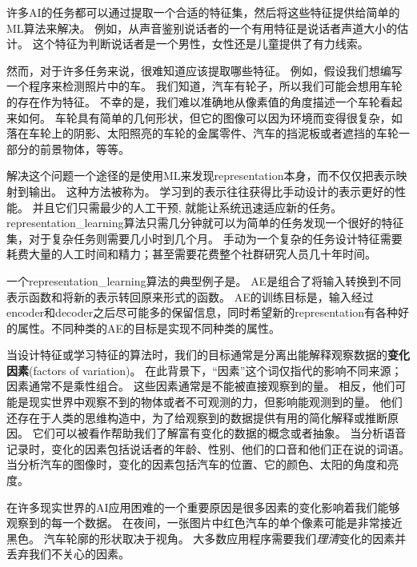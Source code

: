 许多\gls{AI}的任务都可以通过提取一个合适的特征集，然后将这些特征提供给简单的\gls{ML}算法来解决。
例如，从声音鉴别说话者的一个有用特征是说话者声道大小的估计。
这个特征为判断说话者是一个男性，女性还是儿童提供了有力线索。

然而，对于许多任务来说，很难知道应该提取哪些特征。
例如，假设我们想编写一个程序来检测照片中的车。
我们知道，汽车有轮子，所以我们可能会想用车轮的存在作为特征。
不幸的是，我们难以准确地从像素值的角度描述一个车轮看起来如何。
车轮具有简单的几何形状，但它的图像可以因为环境而变得很复杂，如落在车轮上的阴影、太阳照亮的车轮的金属零件、汽车的挡泥板或者遮挡的车轮一部分的前景物体，等等。


解决这个问题一个途径的是使用\gls{ML}来发现\gls{representation}本身，而不仅仅把表示映射到输出。
这种方法被称为。
学习到的表示往往获得比手动设计的表示更好的性能。
并且它们只需最少的人工干预, 就能让系统迅速适应新的任务。
\gls{representation_learning}算法只需几分钟就可以为简单的任务发现一个很好的特征集，对于复杂任务则需要几小时到几个月。
手动为一个复杂的任务设计特征需要耗费大量的人工时间和精力；甚至需要花费整个社群研究人员几十年时间。

一个\gls{representation_learning}算法的典型例子是。
\gls{AE}是组合了将输入转换到不同表示函数和将新的表示转回原来形式的函数。 
\gls{AE}的训练目标是，输入经过\gls{encoder}和\gls{decoder}之后尽可能多的保留信息，同时希望新的\gls{representation}有各种好的属性。不同种类的\gls{AE}的目标是实现不同种类的属性。

当设计特征或学习特征的算法时，我们的目标通常是分离出能解释观察数据的\textbf{变化因素}(factors of variation)。
在此背景下，``因素''这个词仅指代的影响不同来源；因素通常不是乘性组合。
这些因素通常是不能被直接观察到的量。
相反，他们可能是现实世界中观察不到的物体或者不可观测的力，但影响能观测到的量。
他们还存在于人类的思维构造中，为了给观察到的数据提供有用的简化解释或推断原因。
它们可以被看作帮助我们了解富有变化的数据的概念或者抽象。
当分析语音记录时，变化的因素包括说话者的年龄、性别、他们的口音和他们正在说的词语。
当分析汽车的图像时，变化的因素包括汽车的位置、它的颜色、太阳的角度和亮度。


在许多现实世界的\gls{AI}应用困难的一个重要原因是很多因素的变化影响着我们能够观察到的每一个数据。
在夜间，一张图片中红色汽车的单个像素可能是非常接近黑色。
汽车轮廓的形状取决于视角。
大多数应用程序需要我们\emph{理清}变化的因素并丢弃我们不关心的因素。

